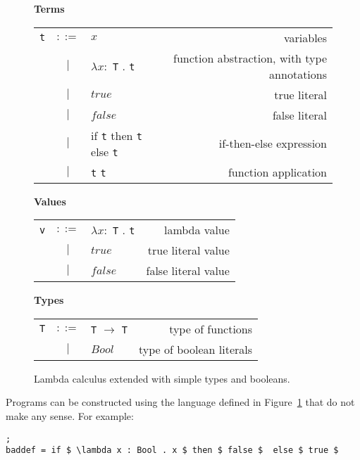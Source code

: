 \begin{figure}[H]\label{fig:simpleCalc}
    \vspace{1cm}
    \textbf{Terms} \\
    \begin{tabular}{l c p{3cm} r}
        \texttt{t} & $ ::= $ & $ x $ &                   variables \\
      & $ | $ & $ \lambda x : $ \texttt{T} . \texttt{t} &          function abstraction, with type annotations \\
      & $ | $ & $ true $ &          true literal \\
      & $ | $ & $ false $ &          false literal \\
      & $ | $ & if \texttt{t} then \texttt{t} else \texttt{t}  &          if-then-else expression \\
      & $ | $ & \texttt{t} \texttt{t} &          function application \\
    \end{tabular}

    \vspace{1cm}
    \textbf{Values} \\
    \begin{tabular}{l c p{3cm} r}
        \texttt{v} & $ ::= $ & $ \lambda x : $ \texttt{T} . \texttt{t} &                   lambda value \\
      & $ | $ & $ true $ &          true literal value \\
      & $ | $ & $ false $ &          false literal value \\
    \end{tabular}

    \vspace{1cm}
    \textbf{Types} \\
    \begin{tabular}{l c p{3cm} r}
        \texttt{T} & $ ::= $ & \texttt{T} $ \rightarrow $ \texttt{T} &      type of functions \\
      & $ | $ & $ Bool $ &          type of boolean literals \\
    \end{tabular}

    \caption{Lambda calculus extended with simple types and booleans.}
\end{figure}
Programs can be constructed using the language defined in Figure~\ref{fig:simpleCalc}
that do not make any sense. For example:

\begin{lstlisting}[mathescape, nolol, label={lst:simple}];
baddef = if $ \lambda x : Bool . x $ then $ false $  else $ true $
\end{lstlisting}

